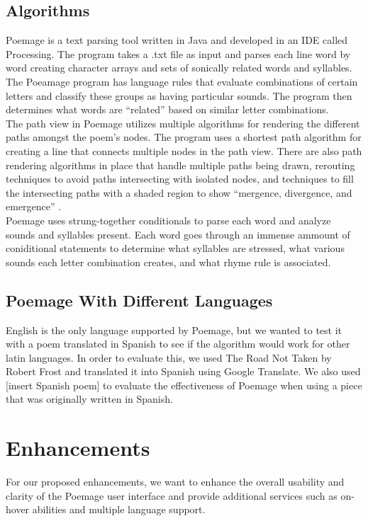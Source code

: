 \documentclass[journal]{vgtc}                %
\begin{document}
\subsection{Algorithms}
Poemage is a text parsing tool written in Java and developed in an IDE called Processing. The program takes a .txt file as input and parses each line word by word creating character arrays and sets of sonically related words and syllables. The Poeamage program has language rules that evaluate combinations of certain letters and classify these groups as having particular sounds. The program then determines what words are ``related'' based on similar letter combinations.\\
\indent The path view in Poemage utilizes multiple algorithms for rendering the different paths amongst the poem's nodes. The program uses a shortest path algorithm for creating a line that connects multiple nodes in the path view. There are also path rendering algorithms in place that handle multiple paths being drawn, rerouting techniques to avoid paths intersecting with isolated nodes, and techniques to fill the intersecting paths with a shaded region to show ``mergence, divergence, and emergence'' \cite{poemage}.\\
\indent Poemage uses strung-together conditionals to parse each word and analyze sounds and syllables present. Each word goes through an immense ammount of coniditional statements to determine what syllables are stressed, what various sounds each letter combination creates, and what rhyme rule is associated.
\subsection{Poemage With Different Languages}
English is the only language supported by Poemage, but we wanted to test it with a poem translated in Spanish to see if the algorithm would work for other latin languages. 
In order to evaluate this, we used The Road Not Taken by Robert Frost and translated it into Spanish using Google Translate. 
We also used [insert Spanish poem] to evaluate the effectiveness of Poemage when using a piece that was originally written in Spanish.
\section{Enhancements} \label{enhancements}
For our proposed enhancements, we want to enhance the overall usability and clarity of the Poemage user interface and provide additional services such as on-hover abilities and multiple language support.
\end{document}
